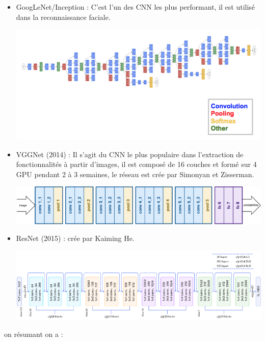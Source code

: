 \begin{itemize}
\begin{center}
	\end{center}
	\item GoogLeNet/Inception :  C'est l'un des CNN les plus performant, il est utilisé dans la reconnaissance faciale. 
		\begin{center}
		\includegraphics[scale=0.4]{img30.png}
	\end{center}
	\item VGGNet (2014) : Il s'agit du CNN le plus populaire dans l'extraction de fonctionnalités à partir d'images, il est composé de 16 couches et formé sur 4 GPU pendant 2 à 3 semaines, le réseau est crée par Simonyan et Zisserman. 
		\begin{center}
		\includegraphics[scale=0.4]{img31.png}
	\end{center}
	\item ResNet (2015) : crée par Kaiming He.
		\begin{center}
		\includegraphics[scale=0.4]{img26.png}
	\end{center}
\end{itemize} 
\newpage
on résumant on a :
